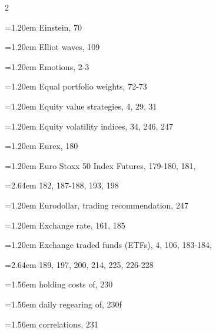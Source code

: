 {\begin{multicols}{2}
\par \noindent\hangindent=1.20em\hspace*{0.00em} Einstein, 70
\par \noindent\hangindent=1.20em\hspace*{0.00em} Elliot waves, 109
\par \noindent\hangindent=1.20em\hspace*{0.00em} Emotions, 2-3
\par \noindent\hangindent=1.20em\hspace*{0.00em} Equal portfolio weights, 72-73
\par \noindent\hangindent=1.20em\hspace*{0.00em} Equity value strategies, 4, 29, 31
\par \noindent\hangindent=1.20em\hspace*{0.00em} Equity volatility indices, 34, 246, 247
\par \noindent\hangindent=1.20em\hspace*{0.00em} Eurex, 180
\par \noindent\hangindent=1.20em\hspace*{0.00em} Euro Stoxx 50 Index Futures, 179-180, 181,
\par \noindent\hangindent=2.64em\hspace*{1.44em} 182, 187-188, 193, 198
\par \noindent\hangindent=1.20em\hspace*{0.00em} Eurodollar, trading recommendation, 247
\par \noindent\hangindent=1.20em\hspace*{0.00em} Exchange rate, 161, 185
\par \noindent\hangindent=1.20em\hspace*{0.00em} Exchange traded funds (ETFs), 4, 106, 183-184,
\par \noindent\hangindent=2.64em\hspace*{1.44em} 189, 197, 200, 214, 225, 226-228
\par \noindent\hangindent=1.56em\hspace*{0.36em} holding costs of, 230
\par \noindent\hangindent=1.56em\hspace*{0.36em} daily regearing of, 230f
\par \noindent\hangindent=1.56em\hspace*{0.36em} correlations, 231

\end{multicols}}
